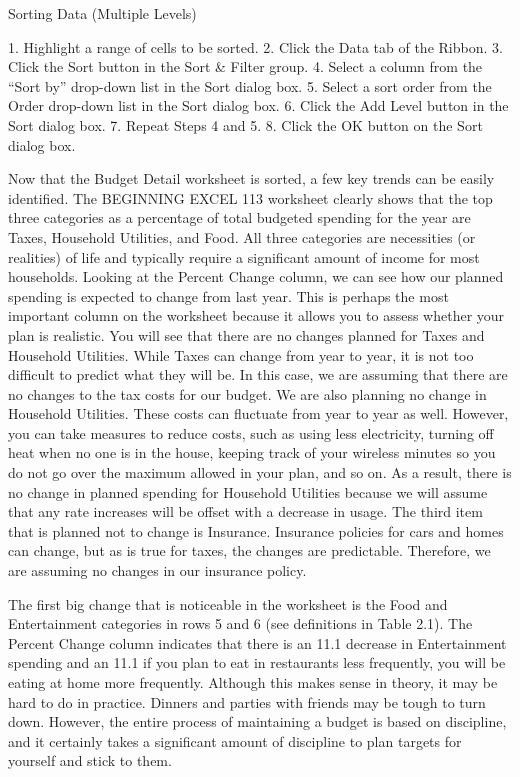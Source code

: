 Sorting Data (Multiple Levels)

1. Highlight a range of cells to be sorted.
2. Click the Data tab of the Ribbon.
3. Click the Sort button in the Sort \& Filter group.
4. Select a column from the “Sort by” drop-down list in the Sort dialog box.
5. Select a sort order from the Order drop-down list in the Sort dialog box.
6. Click the Add Level button in the Sort dialog box.
7. Repeat Steps 4 and 5.
8. Click the OK button on the Sort dialog box.



Now that the Budget Detail worksheet is sorted, a few key trends can be easily identified. The
BEGINNING EXCEL 113
worksheet clearly shows that the top three categories as a percentage of total budgeted spending for
the year are Taxes, Household Utilities, and Food. All three categories are necessities (or realities) of
life and typically require a significant amount of income for most households. Looking at the Percent
Change column, we can see how our planned spending is expected to change from last year. This is
perhaps the most important column on the worksheet because it allows you to assess whether your
plan is realistic. You will see that there are no changes planned for Taxes and Household Utilities.
While Taxes can change from year to year, it is not too difficult to predict what they will be. In this
case, we are assuming that there are no changes to the tax costs for our budget. We are also planning
no change in Household Utilities. These costs can fluctuate from year to year as well. However, you
can take measures to reduce costs, such as using less electricity, turning off heat when no one is in the
house, keeping track of your wireless minutes so you do not go over the maximum allowed in your
plan, and so on. As a result, there is no change in planned spending for Household Utilities because
we will assume that any rate increases will be offset with a decrease in usage. The third item that is
planned not to change is Insurance. Insurance policies for cars and homes can change, but as is true
for taxes, the changes are predictable. Therefore, we are assuming no changes in our insurance policy.

The first big change that is noticeable in the worksheet is the Food and Entertainment categories in
rows 5 and 6 (see definitions in Table 2.1). The Percent Change column indicates that there is an 11.1%
decrease in Entertainment spending and an 11.1%
if you plan to eat in restaurants less frequently, you will be eating at home more frequently. Although
this makes sense in theory, it may be hard to do in practice. Dinners and parties with friends may be
tough to turn down. However, the entire process of maintaining a budget is based on discipline, and
it certainly takes a significant amount of discipline to plan targets for yourself and stick to them.

